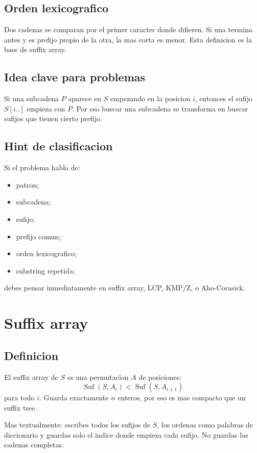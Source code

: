 \documentclass[10pt]{article}
\newcommand{\Suf}{\operatorname{Suf}}
\begin{document}
\subsection{Orden lexicografico}
Dos cadenas se comparan por el primer caracter donde difieren. Si una termina
antes y es prefijo propio de la otra, la mas corta es menor. Esta definicion es
la base de suffix array.

\subsection{Idea clave para problemas}
Si una subcadena $P$ aparece en $S$ empezando en la posicion $i$, entonces el
sufijo $S[i..]$ empieza con $P$. Por eso buscar una subcadena se transforma en
buscar sufijos que tienen cierto prefijo.

\subsection{Hint de clasificacion}
Si el problema habla de:
\begin{itemize}[leftmargin=*]
\item patron;
\item subcadena;
\item sufijo;
\item prefijo comun;
\item orden lexicografico;
\item substring repetida;
\end{itemize}
debes pensar inmediatamente en suffix array, LCP, KMP/Z, o Aho-Corasick.

\newpage
\section{Suffix array}

\subsection{Definicion}
El suffix array de $S$ es una permutacion $A$ de posiciones:
\[
\Suf(S,A_i) < \Suf(S,A_{i+1})
\]
para todo $i$. Guarda exactamente $n$ enteros, por eso es mas compacto que un
suffix tree.

Mas textualmente: escribes todos los sufijos de $S$, los ordenas como palabras
de diccionario y guardas solo el indice donde empieza cada sufijo. No guardas
las cadenas completas.
\end{document}
